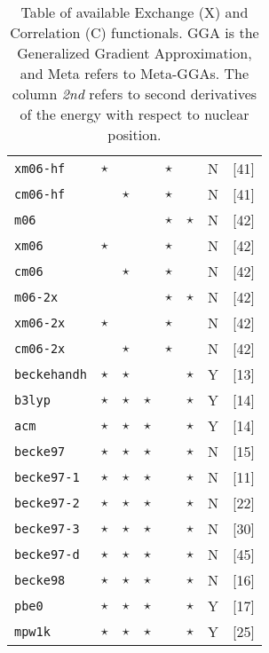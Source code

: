 \begin{table}[htp]
{\begin{tabular}{|l|p{0.12cm}p{0.12cm}cccp{0.35cm}|c|}
{\tt  xm06-hf  }& $\star$  &             &       &$\star$&       &  N   &[41]\\
{\tt  cm06-hf  }&          & $\star$     &       &$\star$&       &  N   &[41]\\
{\tt  m06      }&          &             &       &$\star$&$\star$&  N   &[42]\\
{\tt  xm06     }& $\star$  &             &       &$\star$&       &  N   &[42]\\
{\tt  cm06     }&          & $\star$     &       &$\star$&       &  N   &[42]\\
{\tt  m06-2x   }&          &             &       &$\star$&$\star$&  N   &[42]\\
{\tt  xm06-2x  }& $\star$  &             &       &$\star$&       &  N   &[42]\\
{\tt  cm06-2x  }&          & $\star$     &       &$\star$&       &  N   &[42]\\
\hline
{\tt  beckehandh}& $\star$  &   $\star$   &           &   & $\star$  &  Y   &[13]\\
{\tt  b3lyp    }& $\star$  &   $\star$   &  $\star$  &   & $\star$  &  Y   &[14]\\
{\tt  acm      }& $\star$  &   $\star$   &  $\star$  &   & $\star$  &  Y   &[14]\\
{\tt  becke97  }& $\star$  &   $\star$   &  $\star$  &   & $\star$  &  N   &[15]\\
{\tt  becke97-1}& $\star$  &   $\star$   &  $\star$  &   & $\star$  &  N   &[11]\\
{\tt  becke97-2}& $\star$  &   $\star$   &  $\star$  &   & $\star$  &  N   &[22]\\
{\tt  becke97-3}& $\star$  &   $\star$   &  $\star$  &   & $\star$  &  N   &[30]\\
{\tt  becke97-d}& $\star$  &   $\star$   &  $\star$  &   & $\star$  &  N   &[45]\\
{\tt  becke98  }& $\star$  &   $\star$   &  $\star$  &   & $\star$  &  N   &[16]\\
{\tt  pbe0     }& $\star$  &   $\star$   &  $\star$  &   & $\star$  &  Y   &[17]\\
{\tt  mpw1k    }& $\star$  &   $\star$   &  $\star$  &   & $\star$  &  Y   &[25]\\
\hline
\end{tabular}
\caption{Table of available Exchange (X) and Correlation (C) functionals.
GGA is the Generalized Gradient Approximation, and Meta refers to Meta-GGAs.
The column {\em 2nd} refers to second derivatives of the
energy with respect to nuclear position. }
\label{tablexc}
}
\end{table}



